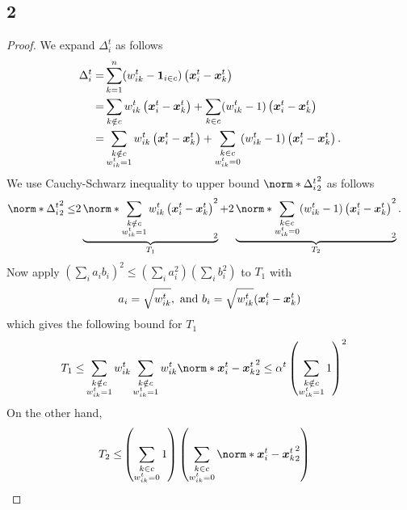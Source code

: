 \documentclass{article}
\begin{document}
\subsection{2}
\begin{proof}
  We expand $\Delta_i^t$ as follows
  \begin{align*}
    \Delta_i^t = & \sum_{k=1}^n (w_{ik}^t - \bm{1}_{i\in c}) \left(\bm{x}_i^t - \bm{x}_k^t\right) \\
    =& \sum_{k\notin c} w_{ik}^t \left(\bm{x}_i^t - \bm{x}_k^t\right)
    + \sum_{k\in c} (w_{ik}^t - 1) \left(\bm{x}_i^t - \bm{x}_k^t\right) \\
    =& 
    \sum_{\substack{k\notin c \\ w_{ik}^t=1}} w_{ik}^t \left(\bm{x}_i^t - \bm{x}_k^t\right)
    + \sum_{\substack{k\in c \\ w_{ik}^t=0}} (w_{ik}^t - 1) \left(\bm{x}_i^t - \bm{x}_k^t\right) .
  \end{align*}
  We use Cauchy-Schwarz inequality to upper bound $\norm*{\Delta_i^t}_2^2$ as follows
  \begin{align*}
    \norm*{\Delta_i^t}_2^2\le& 
    2 \underbrace{\norm*{\sum_{\substack{k\notin c \\ w_{ik}^t=1}} w_{ik}^t \left(\xx_i^t - \xx_k^t\right)}_2^2}_{T_1}
    + 2 \underbrace{\norm*{\sum_{\substack{k\in c \\ w_{ik}^t=0}} (w_{ik}^t - 1) \left(\xx_i^t - \xx_k^t\right)}_2^2}_{T_2}.
  \end{align*}
  Now apply $(\sum_i a_i b_i)^2 \le (\sum_i a_i^2)(\sum_i b_i^2)$ to $T_1$ with 
  \begin{align*}
    a_i=\sqrt{w_{ik}^t}, \text{ and } b_i=\sqrt{w_{ik}^t} (\bm{x}_i^t - \bm{x}_k^t)
  \end{align*}
  which gives the following bound for $T_1$ 
  \begin{align*}
    T_1 \le& \sum_{\substack{k\notin c \\ w_{ik}^t=1}} w_{ik}^t \sum_{\substack{k\notin c \\ w_{ik}^t=1}} w_{ik}^t \norm*{ \xx_i^t - \xx_k^t}_2^2
    \le \alpha^t \left(\sum_{\substack{k\notin c \\ w_{ik}^t=1}} 1\right)^2 
  \end{align*}
  On the other hand,
  \begin{align*}
    T_2
    \le& \left(\sum_{\substack{k\in c \\ w_{ik}^t=0}} 1\right) \left(\sum_{\substack{k\in c \\ w_{ik}^t=0}} \norm*{ \xx_i^t - \xx_k^t}_2^2 \right) 

\end{align*}
\end{proof}
\end{document}
